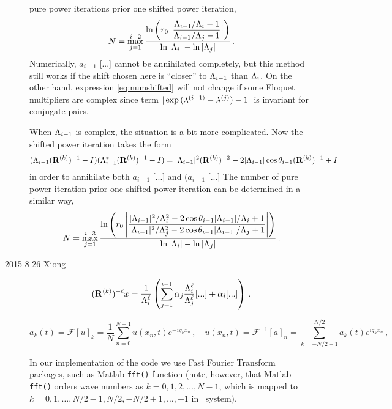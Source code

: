 \begin{description}
pure power iterations prior one shifted power iteration,
\begin{equation}
  \label{eq:numshifted}
  N=\max_{j=1}^{i-2}\dfrac{\ln
\left(r_{0}\left|\dfrac{\Lambda_{i-1}/\Lambda_{i}-1}
{\Lambda_{i-1}/\Lambda_{j}-1}\right|\right)}{\ln|\Lambda_i| - \ln|\Lambda_j|}
\,.
\end{equation}
Numerically, $a_{i-1}$  [...] %
cannot be annihilated completely, but
this method still works if the shift chosen here is  ``closer'' to
$\Lambda_{i-1}$ than $\Lambda_{i}$. On the other hand, expression
\eqref{eq:numshifted} will not change if some Floquet multipliers
are complex since term $|\exp{(\eigExp[i-1]-\eigExp[j])}-1|$ is invariant
for conjugate pairs.

When $\Lambda_{i-1}$ is complex, the situation is a bit more
complicated. Now the shifted power iteration takes the form
\[
(\Lambda_{i-1}(\mathbf{R}^{(k)})^{-1} -I)
(\Lambda_{i-1}^{*}(\mathbf{R}^{(k)})^{-1} -I)
=|\Lambda_{i-1}|^2 (\mathbf{R}^{(k)})^{-2}
-2|\Lambda_{i-1}|\cos\theta_{i-1}(\mathbf{R}^{(k)})^{-1}+I
\]
in order to annihilate both $a_{i-1}$  [...] %
and
$(a_{i-1}$  [...] %
The number of pure power iteration prior
one shifted power iteration can be determined in a similar way,
\begin{equation}
  \label{eq:numshifted2}
  N=\max_{j=1}^{i-3}\dfrac{\ln \left(r_{0} \left|
        \dfrac{|\Lambda_{i-1}|^2/\Lambda_{i}^2 -
          2\cos\theta_{i-1}|\Lambda_{i-1}|/\Lambda_{i}
          +1}
        {|\Lambda_{i-1}|^2/\Lambda_{j}^2 -
          2\cos\theta_{i-1}|\Lambda_{i-1}|/\Lambda_{j}
          +1
        }
      \right|\right)}{\ln|\Lambda_i| - \ln|\Lambda_j|}
  \,.
\end{equation}

\item[2015-8-26 Xiong]
\[
(\ps{R}{k})^{-\ell}x
 =\frac{1}{\ExpaEig_{i}^{\ell}}
  \left(
    \sum_{j=1}^{i-1}
    \alpha_{j}\frac{\ExpaEig_{i}^{\ell}}{\ExpaEig_{j}^{\ell}} [...] %
    + \alpha_{i} [...] %
  \right)
\,.
\]

\[
a_{k}(t)=\mathcal{F}[u]_k=\frac{1}{N}\sum_{n=0}^{N-1}u(x_{n},t)e^{-iq_{k}x_{n}}
\,,\quad
u(x_{n},t)=\mathcal{F}^{-1}[a]_n=\!\!\sum_{k=-N/2+1}^{N/2}\!\!a_{k}(t)e^{iq_{k}x_{n}}
\,,
\]



In our implementation of the code we use Fast Fourier Transform packages,
such as Matlab \texttt{fft()} function (note, however, that Matlab
\texttt{fft()} orders wave numbers as $k=0,1,2,\dots , N-1$, which is
mapped to $k=0,1,\dots , N/2-1, N/2, -N/2+1,\dots, -1$ in \KS\ system).

\end{description}
